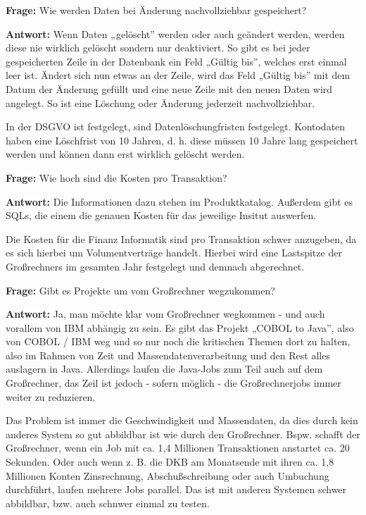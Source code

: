 \bigbreak
\bigbreak

\textbf{Frage:}
\label{i1:f2}
Wie werden Daten bei Änderung nachvollziehbar gespeichert?


\textbf{Antwort:}
Wenn Daten „gelöscht” werden oder auch geändert werden, werden diese nie wirklich gelöscht sondern nur deaktiviert.
So gibt es bei jeder gespeicherten Zeile in der Datenbank ein Feld „Gültig bis”, welches erst einmal leer ist. 
Ändert sich nun etwas an der Zeile, wird das Feld „Gültig bis” mit dem Datum der Änderung gefüllt und eine neue Zeile mit den neuen Daten wird angelegt.
So ist eine Löschung oder Änderung jederzeit nachvollziehbar.

In der DSGVO ist festgelegt, sind Datenlöschungfristen festgelegt.
Kontodaten haben eine Löschfrist von 10 Jahren, d. h. diese müssen 10 Jahre lang gespeichert werden und können dann erst wirklich gelöscht werden.

\bigbreak
\bigbreak

\textbf{Frage:}
\label{i1:f3}
Wie hoch sind die Kosten pro Transaktion?


\textbf{Antwort:} 
Die Informationen dazu stehen im Produktkatalog. Außerdem gibt es SQLs, die einem die genauen Kosten für das jeweilige Insitut auswerfen.

Die Kosten für die Finanz Informatik sind pro Transaktion schwer anzugeben, da es sich hierbei um Volumentverträge handelt. 
Hierbei wird eine Lastspitze der Großrechners im gesamten Jahr festgelegt und demnach abgerechnet. 


\bigbreak
\bigbreak

\textbf{Frage:}
\label{i1:f4}
Gibt es Projekte um vom Großrechner wegzukommen?


\textbf{Antwort:}
Ja, man möchte klar vom Großrechner wegkommen - und auch vorallem von IBM abhängig zu sein.
Es gibt das Projekt „COBOL to Java”, also von COBOL / IBM weg und so nur noch die kritischen Themen dort zu halten, also im Rahmen von Zeit und Massendatenverarbeitung und den Rest alles auslagern in Java.
Allerdings laufen die Java-Jobs zum Teil auch auf dem Großrechner, das Zeil ist jedoch - sofern möglich - die Großrechnerjobs immer weiter zu reduzieren.

Das Problem ist immer die Geschwindigkeit und Massendaten, da dies durch kein anderes System so gut abbildbar ist wie durch den Großrechner.
Bspw. schafft der Großrechner, wenn ein Job mit ca. 1,4 Millionen Transaktionen anstartet ca. 20 Sekunden.
Oder auch wenn z. B. die DKB am Monatsende mit ihren ca. 1,8 Millionen Konten Zinsrechnung, Abschußschreibung oder auch Umbuchung durchführt, laufen mehrere Jobs parallel.
Das ist mit anderen Systemen schwer abbildbar, bzw. auch schnwer einmal zu testen.


